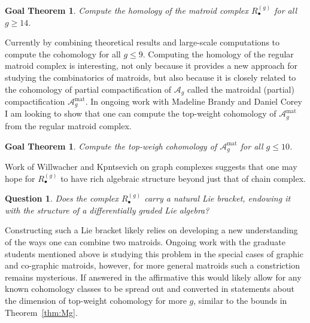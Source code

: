 \documentclass[11pt,reqno]{amsart}
\newtheorem{goalTheorem}[lemma]{Goal Theorem}
\newtheorem{question}[lemma]{Question}
\theoremstyle{remark}
\newcommand{\mat}{\operatorname{mat}}
\newcommand{\cA}{\mathcal{A}}
\begin{document}
\begin{goalTheorem}
Compute the homology of the matroid complex $R_{\bullet}^{(g)}$ for all $g\geq 14$.
\end{goalTheorem}

Currently by combining theoretical results and large-scale computations to compute the cohomology for all $g\leq 9$. Computing the homology of the regular matroid complex is interesting, not only because it provides a new approach for studying the combinatorics of matroids, but also because it is closely related to the cohomology of partial compactification of $\cA_{g}$ called the matroidal (partial) compactification $\cA_{g}^{\mat}$. In ongoing work with Madeline Brandy and Daniel Corey I am looking to show that one can compute the top-weight cohomology of $\cA_{g}^{\mat}$ from the regular matroid complex. 

\begin{goalTheorem}
Compute the top-weigh cohomology of $\cA_{g}^{\mat}$ for all $g\leq 10$. 
\end{goalTheorem}

Work of Willwacher \cite{willwacher15} and Kpntsevich \cite{kontsevich93, kontsevich94} on graph complexes suggests that one may hope for $R_{\bullet}^{(g)}$ to have rich algebraic structure beyond just that of chain complex.

\begin{question}
Does the complex $R_{\bullet}^{(g)}$ carry a natural Lie bracket, endowing it with the structure of a differentially graded Lie algebra?
\end{question}

Constructing such a Lie bracket likely relies on developing a new understanding of the ways one can combine two matroids. Ongoing work with the graduate students mentioned above is studying this problem in the special cases of graphic and co-graphic matroids, however, for more general matroids such a constriction remains mysterious. If answered in the affirmative this would likely allow for any known cohomology classes to be spread out and converted in statements about the dimension of top-weight cohomology for more $g$, similar to the bounds in Theorem~\ref{thm:Mg}.
\end{document}
